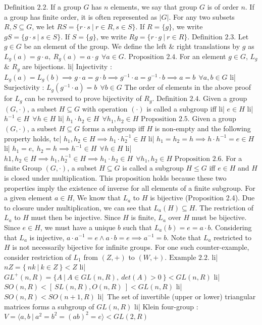 \( \text{Definition 2.2.} \) If a group \(G\) has \(n\) elements, we say that group \(G\) is of order \(n\). If a group has finite order, it is often represented as \(|G|\).
For any two subsets \( R,S \subseteq G\), we let \( RS = \{ r \cdot s \ | \ r \in R, s \in S \} \). If \( R = \{g\} \), we write \( gS = \{ g \cdot s \ | \ s \in S \} \). If \( S = \{ g \} \), we write \( Rg = \{ r \cdot g \ | \ r \in R \} \).
\( \text{Definition 2.3.} \) Let \(g \in G\) be an element of the group. We define the left & right translations by \(g\) as \(L_g(a) = g \cdot a, \ R_g(a) = a \cdot g \ \ \forall a \in G \).
\( \text{Proposition 2.4.} \) For an element \(g \in G\), \( L_g \) & \( R_g \) are bijections.
li| Injectivity : \( L_g(a) = L_g(b) \implies g \cdot a = g \cdot b \implies g^{-1} \cdot a = g^{-1} \cdot b \implies a = b \ \ \forall a, b \in G \)
li| Surjectivity : \( L_g(g^{-1} \cdot a) = b \ \ \forall b \in G \)
The order of elements in the above proof for \( L_g \) can be reversed to prove bijectivity of \(R_g\).
\( \text{Definition 2.4.} \) Given a group \( (G, \cdot) \), a subset \( H \subseteq G \) with operation \((\cdot)\) is called a subgroup iff
li| \( e \in H \)
li| \( h^{-1} \in H \ \ \forall h \in H \)
li| \( h_1 \cdot h_2 \in H \ \ \forall h_1,h_2\in H \)
\( \text{Proposition 2.5.} \) Given a group \( (G, \cdot) \), a subset \( H \subseteq G \) forms a subgroup iff \(H\) is non-empty and the following property holds,
tc| \( h_1, h_2 \in H \implies h_1 \cdot h_2^{-1} \in H \)
li| \( h_1 = h_2 = h \implies h \cdot h^{-1} = e \in H \)
li| \( h_1 = e, \ h_2 = h \implies h^{-1} \in H \ \ \forall h \in H \)
li| \( h1, h_2 \in H \implies h_1, h_2^{-1} \in H \implies h_1 \cdot h_2 \in H \ \ \forall h_1, h_2 \in H \)
\( \text{Proposition 2.6.} \) For a finite Group \( (G, \cdot) \), a subset \( H \subseteq G \) is called a subgroup \( H \leq G \) iff \( e \in H \) and \( H \) is closed under multiplication.
This proposition holds because these two properties imply the existence of inverse for all elements of a finite subgroup. For a given element \( a \in H \), We know that \( L_a \) to \( H \) is bijective (Proposition 2.4). Due to closure under multiplication, we can see that \( L_a(H) \subseteq H \). The restriction of \( L_a \) to \( H \) must then be injective. Since \( H \) is finite, \( L_a \) over \( H \) must be bijective. Since \( e \in H \), we must have a unique \( b \) such that \( L_a(b) = e = a \cdot b \). Considering that \(L_a\) is injective, \( a \cdot a^{-1} = e \land a \cdot b = e \implies a^{-1} = b \).
Note that \( L_a \) restricted to \( H \) is not necessarily bijective for infinite groups. For one such counter-example, consider restriction of \( L_1 \) from \( (Z, +) \) to \( (W, +) \).
\( \text{Example 2.2.} \)
li| \( nZ = \{ \ nk \ | \ k \in Z \ \} < Z \)
li| \( GL^+(n, R) = \{ A \ | \ A \in GL(n, R), \ det(A) > 0 \ \} < GL(n, R) \)
li| \( SO(n, R) < [ \ SL(n, R), O(n, R) \ ] < GL(n, R) \)
li| \( SO(n, R) < SO(n+1, R) \)
li| The set of invertible (upper or lower) triangular matrices forms a subgroup of \( GL(n, R) \)
li| Klein four-group : \( V = \langle a, b \ | \ a^2 = b^2 = (ab)^2 = e \rangle < GL(2, R) \)